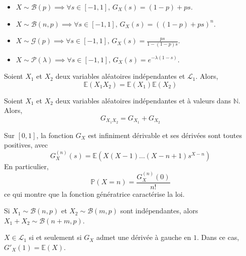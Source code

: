 
	\begin{example}
		\begin{itemize}
			\item $X \sim \mathcal{B}(p) \implies \forall s \in [-1,1], \, G_X(s) = (1-p) + ps$.
			\item $X \sim \mathcal{B}(n, p) \implies \forall s \in [-1,1], \, G_X(s) = ((1-p) + ps)^n$.
			\item $X \sim \mathcal{G}(p) \implies \forall s \in [-1,1], \, G_X(s) = \frac{ps}{1-(1-p)s}$.
			\item $X \sim \mathcal{P}(\lambda) \implies \forall s \in [-1,1], \, G_X(s) = e^{-\lambda (1-s)}$.
		\end{itemize}
	\end{example}

	\begin{theorem}
		Soient $X_1$ et $X_2$ deux variables aléatoires indépendantes et $\mathcal{L}_1$. Alors,
		\[ \mathbb{E}(X_1 X_2) = \mathbb{E}(X_1) \mathbb{E}(X_2) \]
	\end{theorem}

	\begin{corollary}
		Soient $X_1$ et $X_2$ deux variables aléatoires indépendantes et à valeurs dans $\mathbb{N}$. Alors,
		\[ G_{X_1 X_2} = G_{X_1} + G_{X_2} \]
	\end{corollary}

	\begin{theorem}
		Sur $[0,1]$, la fonction $G_X$ est infiniment dérivable et ses dérivées sont toutes positives, avec
		\[ G_X^{(n)}(s) = \mathbb{E}(X(X-1) \dots (X-n+1)s^{X-n}) \]
		En particulier,
		\[ \mathbb{P}(X=n) = \frac{G_X^{(n)}(0)}{n!} \]
		ce qui montre que la fonction génératrice caractérise la loi.
	\end{theorem}


	\begin{example}
		Si $X_1 \sim \mathcal{B}(n, p)$ et $X_2 \sim \mathcal{B}(m, p)$ sont indépendantes, alors $X_1 + X_2 \sim \mathcal{B}(n + m, p)$.
	\end{example}


	\begin{theorem}
		$X \in \mathcal{L}_1$ si et seulement si $G_X$ admet une dérivée à gauche en $1$. Dans ce cas, $G'_X(1) = \mathbb{E}(X)$.
	\end{theorem}

